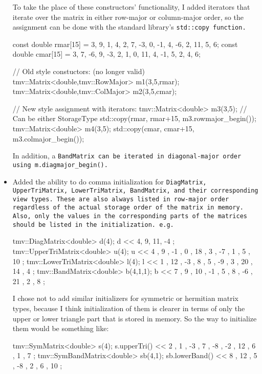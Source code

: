 \begin{itemize}
To take the place of these constructors' functionality, I added iterators that iterate over the matrix in either row-major or column-major order, so the assignment can be done with the standard library's \tt{std::copy} function.

\begin{tmvcode}
const double rmar[15] = 
    { 3, 9, 1, 4, 2, 7, -3, 0, -1, 4, -6, 2, 11, 5, 6};
const double cmar[15] = 
    { 3, 7, -6, 9, -3, 2, 1, 0, 11, 4, -1, 5, 2, 4, 6};

// Old style constuctors: (no longer valid)
tmv::Matrix<double,tmv::RowMajor> m1(3,5,rmar);
tmv::Matrix<double,tmv::ColMajor> m2(3,5,cmar);

// New style assignment with iterators:
tmv::Matrix<double> m3(3,5); // Can be either StorageType
std::copy(rmar, rmar+15, m3.rowmajor_begin());
tmv::Matrix<double> m4(3,5);
std::copy(cmar, cmar+15, m3.colmajor_begin());
\end{tmvcode}

In addition, a \tt{BandMatrix} can be iterated in diagonal-major order using \tt{m.diagmajor\_begin()}.

\item 
Added the ability to do comma initialization for \tt{DiagMatrix}, \tt{UpperTriMatrix}, \tt{LowerTriMatrix}, \tt{BandMatrix}, and their corresponding view types.  These are also always listed in row-major order regardless of the actual storage order of the matrix in memory.  Also, only the values in the corresponding parts of the matrices should be listed in the initialization.  e.g.
\begin{tmvcode}
tmv::DiagMatrix<double> d(4);
d << 4,
        9,
           11,
              -4 ;
tmv::UpperTriMatrix<double> u(4);
u << 4 ,  9 , -1 ,  0 ,
         18 ,  3 , -7 ,
               1 ,  5 ,
                   10 ;
tmv::LowerTriMatrix<double> l(4);
l <<  1 ,
     12 , -3 ,
      8 ,  5 , -9 ,
      3 , 20 , 14 ,  4 ;
tmv::BandMatrix<double> b(4,1,1);
b <<  7 ,  9 ,
     10 , -1 ,  5 ,
           8 , -6 , 21 ,
                2 ,  8 ;
\end{tmvcode}

I chose not to add similar initializers for symmetric or hermitian matrix types, because I think initialization of them is clearer in terms of only the upper or lower triangle part that is stored in memory.  So the way to initialize them would be something like:
\begin{tmvcode}
tmv::SymMatrix<double> s(4);
s.upperTri() << 2 ,  1 , -3 ,  7 ,
                    -8 , -2 , 12 ,
                          6 ,  1 ,
                               7 ;
tmv::SymBandMatrix<double> sb(4,1);
sb.lowerBand() <<  8 ,
                  12 ,  5 ,
                       -8 ,  2 ,
                             6 , 10 ;
\end{tmvcode}


\end{itemize}
